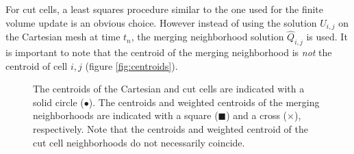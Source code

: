 \begin{enumerate}
\vspace*{.1in}
For cut cells, a least squares procedure  similar to the one used for
the finite volume update is an obvious choice. However instead of using the
solution $U_{i,j}$ on the Cartesian mesh at time $t_n$,
the merging neighborhood solution  $\widehat{Q}_{i,j}$ is used. It is important
to note that the centroid of the merging neighborhood is \textit{not} the centroid of cell ${i,j}$ (figure \ref{fig:centroids}).
\begin{figure}
    \centering
     \hfill
    \caption{\sf The centroids of the Cartesian and cut cells are indicated with a solid circle ($\bullet$).  The centroids and weighted centroids of the merging neighborhoods are indicated with a square ($\blacksquare$) and a cross ($\times$), respectively. Note that the centroids and weighted centroid of the cut cell neighborhoods do not necessarily coincide.}

\end{figure}
\end{enumerate}
